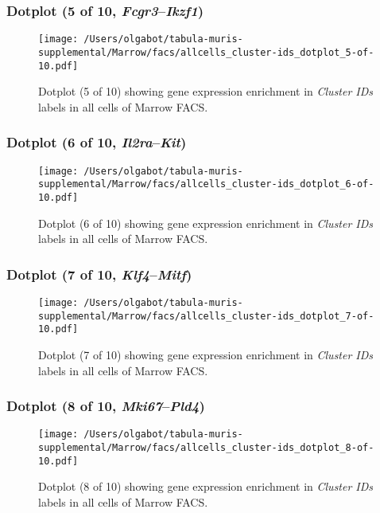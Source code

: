 \clearpage

\subsubsection{Dotplot (5 of 10, \emph{Fcgr3}--\emph{Ikzf1})}
\begin{figure}[h]
\centering
\texttt{[image: /Users/olgabot/tabula-muris-supplemental/Marrow/facs/allcells\_cluster-ids\_dotplot\_5-of-10.pdf]}

\caption{ Dotplot (5 of 10)  showing gene expression enrichment in \emph{Cluster IDs} labels in all cells of Marrow FACS. }
\end{figure}


\clearpage

\subsubsection{Dotplot (6 of 10, \emph{Il2ra}--\emph{Kit})}
\begin{figure}[h]
\centering
\texttt{[image: /Users/olgabot/tabula-muris-supplemental/Marrow/facs/allcells\_cluster-ids\_dotplot\_6-of-10.pdf]}

\caption{ Dotplot (6 of 10)  showing gene expression enrichment in \emph{Cluster IDs} labels in all cells of Marrow FACS. }
\end{figure}


\clearpage

\subsubsection{Dotplot (7 of 10, \emph{Klf4}--\emph{Mitf})}
\begin{figure}[h]
\centering
\texttt{[image: /Users/olgabot/tabula-muris-supplemental/Marrow/facs/allcells\_cluster-ids\_dotplot\_7-of-10.pdf]}

\caption{ Dotplot (7 of 10)  showing gene expression enrichment in \emph{Cluster IDs} labels in all cells of Marrow FACS. }
\end{figure}


\clearpage

\subsubsection{Dotplot (8 of 10, \emph{Mki67}--\emph{Pld4})}
\begin{figure}[h]
\centering
\texttt{[image: /Users/olgabot/tabula-muris-supplemental/Marrow/facs/allcells\_cluster-ids\_dotplot\_8-of-10.pdf]}

\caption{ Dotplot (8 of 10)  showing gene expression enrichment in \emph{Cluster IDs} labels in all cells of Marrow FACS. }
\end{figure}


